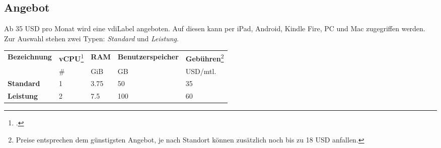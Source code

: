 \subsection{Angebot}
Ab 35 USD pro Monat wird eine \Gls{vdiLabel} angeboten. Auf diesen kann per iPad, Android, Kindle Fire, PC und Mac zugegriffen werden.\\
Zur Auswahl stehen zwei Typen: \textit{Standard} und \textit{Leistung}.



\begin{table}[H]
	\centering
	\small\renewcommand{\arraystretch}{1.4}  
	\begin{tabularx}{0.8\textwidth}{X | Y | Y | Y | Y }
		\hline
		\textbf{Bezeichnung} & \textbf{vCPU}\footcite{Virtual_CPUs_with_Amazon_Web_Services_2014-11-15} & \textbf{RAM} & \textbf{Benutzerspeicher} & \textbf{Gebühren}\footnote{Preise entsprechen dem günstigsten Angebot, je nach Standort können zusätzlich noch bis zu 18 USD anfallen.}\\
		 & \# & GiB & GB & USD/mtl.\\
		\hline
			\textbf{Standard} & 1 & 3.75 & 50 & 35\\
			\textbf{Leistung} & 2 & 7.5 & 100 & 60\\
		\hline
	\end{tabularx}
\end{table}

